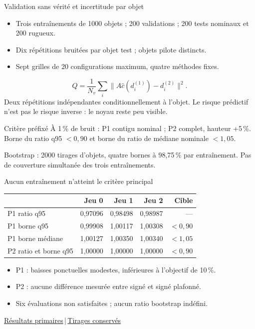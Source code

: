 \documentclass[aspectratio=169,10pt]{beamer}
\newcommand{\norm}[1]{\lVert#1\rVert}
\newcommand{\src}[2]{\href{\DataURL{#1}}{#2}}
\begin{document}
\begin{frame}{Validation sans vérité et incertitude par objet}
\begin{itemize}
\item Trois entraînements de 1000 objets ; 200 validations ; 200 tests nominaux et 200 rugueux.
\item Dix répétitions bruitées par objet test ; objets pilote distincts.
\item Sept grilles de 20 configurations maximum, quatre méthodes fixes.
\end{itemize}
\[
Q=\frac1{N_v}\sum_i\norm{A\widehat c(d_i^{(1)})-d_i^{(2)}}^2.
\]
\small Deux répétitions indépendantes conditionnellement à l'objet. Le risque prédictif n'est pas le risque inverse : le noyau reste peu visible.
\begin{block}{Critère préfixé}
À 1\,\% de bruit : P1 contigu nominal ; P2 complet, hauteur +5\,\%. Borne du ratio q95 $<0,90$ et borne du ratio de médiane nominale $<1,05$.
\end{block}
\tiny Bootstrap : 2000 tirages d'objets, quatre bornes à 98,75\,\% par entraînement. Pas de couverture simultanée des trois entraînements.
\end{frame}

\begin{frame}{Aucun entraînement n'atteint le critère principal}
\begin{center}\small\begin{tabular}{lrrrr}\toprule
 & Jeu 0 & Jeu 1 & Jeu 2 & Cible\\\midrule
P1 ratio q95 & 0,97096 & 0,98498 & 0,98987 & ---\\
P1 borne q95 & 0,99908 & 1,00117 & 1,00308 & $<0,90$\\
P1 borne médiane & 1,00127 & 1,00350 & 1,00340 & $<1,05$\\
P2 ratio et borne q95 & 1,00000 & 1,00000 & 1,00000 & $<0,90$\\\bottomrule
\end{tabular}\end{center}
\begin{itemize}
\item P1 : baisses ponctuelles modestes, inférieures à l'objectif de 10\,\%.
\item P2 : aucune différence mesurée entre signé et signé plafonné.
\item Six évaluations non satisfaites ; aucun ratio bootstrap indéfini.
\end{itemize}
\vfill\tiny\src{results/analysis/primary.json}{Résultats primaires}\,|\,\src{results/analysis/bootstrap.npz}{Tirages conservés}
\end{frame}
\end{document}
